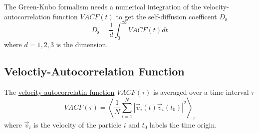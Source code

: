 \documentclass[
  letterpaper,
  DIV=11,
  numbers=noendperiod]{scrreprt}
\begin{document}

The Green-Kubo formalism needs a numerical integration of the
velocity-autocorrelation function \(VACF(t)\) to get the self-diffusion
coefficent \(D_{\mathrm{s}}\) \[
D_{\mathrm{s}} = \frac{1}{d} \int _{0}^{\infty} VACF(t)  dt
\] where \(d=1,2,3\) is the dimension.

\hypertarget{veloctiy-autocorrelation-function}{%
\subsection{Veloctiy-Autocorrelation
Function}\label{veloctiy-autocorrelation-function}}

The \href{}{velocity-autocorrelatin function} \(VACF(\tau)\) is averaged
over a time interval \(\tau\) \[
VACF(\tau) = \left < \frac{1}{N} \sum_{i=1}^{N} |\vec{v} _{i}(t) \vec{v} _{i}(t_0)|^2 \right >_{\tau}
\] where \(\vec{v}_{i}\) is the velocity of the particle \(i\) and
\(t_0\) labels the time origin.
\end{document}
